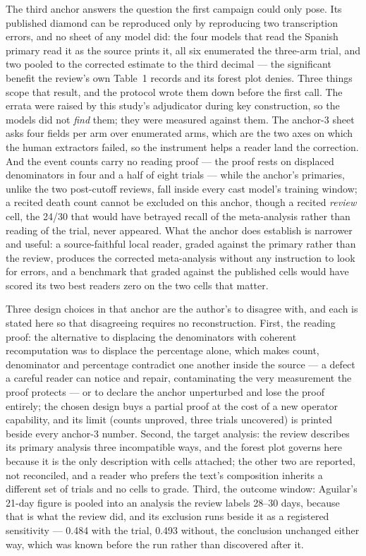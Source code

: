 \documentclass[11pt]{article}
\begin{document}
The third anchor answers the question the first campaign could only pose. Its published diamond can be reproduced only by reproducing two transcription errors, and no sheet of any model did: the four models that read the Spanish primary read it as the source prints it, all six enumerated the three-arm trial, and two pooled to the corrected estimate to the third decimal --- the significant benefit the review's own Table~1 records and its forest plot denies. Three things scope that result, and the protocol wrote them down before the first call. The errata were raised by this study's adjudicator during key construction, so the models did not \emph{find} them; they were measured against them. The anchor-3 sheet asks four fields per arm over enumerated arms, which are the two axes on which the human extractors failed, so the instrument helps a reader land the correction. And the event counts carry no reading proof --- the proof rests on displaced denominators in four and a half of eight trials --- while the anchor's primaries, unlike the two post-cutoff reviews, fall inside every cast model's training window; a recited death count cannot be excluded on this anchor, though a recited \emph{review} cell, the 24/30 that would have betrayed recall of the meta-analysis rather than reading of the trial, never appeared. What the anchor does establish is narrower and useful: a source-faithful local reader, graded against the primary rather than the review, produces the corrected meta-analysis without any instruction to look for errors, and a benchmark that graded against the published cells would have scored its two best readers zero on the two cells that matter.

Three design choices in that anchor are the author's to disagree with, and each is stated here so that disagreeing requires no reconstruction. First, the reading proof: the alternative to displacing the denominators with coherent recomputation was to displace the percentage alone, which makes count, denominator and percentage contradict one another inside the source --- a defect a careful reader can notice and repair, contaminating the very measurement the proof protects --- or to declare the anchor unperturbed and lose the proof entirely; the chosen design buys a partial proof at the cost of a new operator capability, and its limit (counts unproved, three trials uncovered) is printed beside every anchor-3 number. Second, the target analysis: the review describes its primary analysis three incompatible ways, and the forest plot governs here because it is the only description with cells attached; the other two are reported, not reconciled, and a reader who prefers the text's composition inherits a different set of trials and no cells to grade. Third, the outcome window: Aguilar's 21-day figure is pooled into an analysis the review labels 28--30 days, because that is what the review did, and its exclusion runs beside it as a registered sensitivity --- 0.484 with the trial, 0.493 without, the conclusion unchanged either way, which was known before the run rather than discovered after it.
\end{document}
